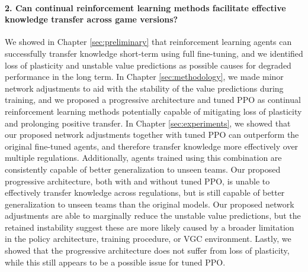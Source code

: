 \paragraph{2. Can continual reinforcement learning methods facilitate effective knowledge transfer across game versions?} We showed in Chapter \ref{sec:preliminary} that reinforcement learning agents can successfully transfer knowledge short-term using full fine-tuning, and we identified loss of plasticity and unstable value predictions as possible causes for degraded performance in the long term.
In Chapter \ref{sec:methodology}, we made minor network adjustments to aid with the stability of the value predictions during training, and we proposed a progressive architecture and tuned PPO as continual reinforcement learning methods potentially capable of mitigating loss of plasticity and prolonging positive transfer.
In Chapter \ref{sec:experiments}, we showed that our proposed network adjustments together with tuned PPO can outperform the original fine-tuned agents, and therefore transfer knowledge more effectively over multiple regulations.
Additionally, agents trained using this combination are consistently capable of better generalization to unseen teams.
Our proposed progressive architecture, both with and without tuned PPO, is unable to effectively transfer knowledge across regulations, but is still capable of better generalization to unseen teams than the original models.
Our proposed network adjustments are able to marginally reduce the unstable value predictions, but the retained instability suggest these are more likely caused by a broader limitation in the policy architecture, training procedure, or VGC environment.
Lastly, we showed that the progressive architecture does not suffer from loss of plasticity, while this still appears to be a possible issue for tuned PPO.

